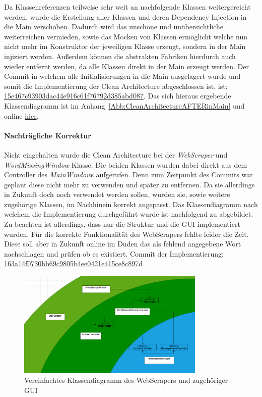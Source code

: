 Da Klassenreferenzen teilweise sehr weit an nachfolgende Klassen \glqq weitergereicht\grqq{} werden, wurde die Erstellung aller Klassen und deren Dependency Injection in die Main verschoben. Dadurch wird das unschöne und unübersichtliche weiterreichen vermieden, sowie das Mocken von Klassen ermöglicht welche nun nicht mehr im Konstruktor der jeweiligen Klasse erzeugt, sondern in der Main injiziert werden. Außerdem können die abstrakten Fabriken hierdurch auch wieder entfernt werden, da alle Klassen direkt in der Main erzeugt werden. Der Commit in welchem alle Initialisierungen in die Main ausgelagert wurde und somit die Implementierung der Clean Architecture abgeschlossen ist, ist: \href{https://github.com/EinToni/Wortfinder/commit/15e467c93903dac44e916c61f76792d385abd087}{15e467c93903dac44e916c61f76792d385abd087}. Das sich hieraus ergebende Klassendiagramm ist im Anhang~\ref{Abb:CleanArchitectureAFTERinMain} und online \href{https://github.com/EinToni/WortfinderDoku/blob/main/Bilder/CleanArchitectureAFTERinMain.png}{hier}.


\paragraph{Nachträgliche Korrektur}
Nicht eingehalten wurde die Clean Architecture bei der \textit{WebScraper} und \textit{WordMissingWindow} Klasse. Die beiden Klassen wurden dabei direkt aus dem Controller des \textit{MainWindow}s aufgerufen. Denn zum Zeitpunkt des Commits war geplant diese nicht mehr zu verwenden und später zu entfernen. Da sie allerdings in Zukunft doch noch verwendet werden sollen, wurden sie, sowie weitere zugehörige Klassen, im Nachhinein korrekt angepasst. Das Klassendiagramm nach welchem die Implementierung durchgeführt wurde ist nachfolgend zu abgebildet. Zu beachten ist allerdings, dass nur die Struktur und die GUI implementiert wurden. Für die korrekte Funktionalität des WebScrapers fehlte leider die Zeit. Diese soll aber in Zukunft online im Duden das als fehlend angegebene Wort nachschlagen und prüfen ob es existiert. Commit der Implementierung: \href{https://github.com/EinToni/Wortfinder/commit/163a14f0730bb69c9805b4ee0421e415ce8c897d}{163a14f0730bb69c9805b4ee0421e415ce8c897d}

\begin{figure}[htb]
\centering
\includegraphics[width=0.8\textwidth]{Bilder/CleanArchitectureWebScraper.PNG}
\caption{\label{Abb:CleanArchitectureWebScraper}Vereinfachtes Klassendiagramm des WebScrapers und zugehöriger GUI}
\end{figure}

\endinput